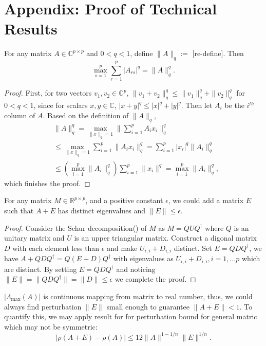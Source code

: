\section{Appendix: Proof of Technical Results}
\label{sec:proof_for_technical_lemmas}

\begin{lem}
\label{lemma:q_norm_eq}
For any matrix $A\in \mathbb{C}^{p \times p}$ and  $0<q<1$, define $\|A\|_q:= $ {\color{red} [re-define]}. Then 
\begin{equation}
\max_{s=1}^p  \sum_{r=1}^p |A_{rs}|^q = \|A\|_q^q.
\end{equation}
\begin{proof}
First, for two vectors $v_1, v_2\in \mathbb{C}^p$, $\|v_1+v_2\|_q^q\le \|v_1\|_q^q + \|v_2\|_q^q$ for $0<q<1$, since for scalars $x,y\in \mathbb{C}$, $|x+y|^q \le |x|^q+|y|^q$. Then let $A_i$ be the $i^{th}$ column of $A$. Based on the definition of $\|A\|_q$, 
\begin{equation}
\begin{aligned}
& \|A\|_q^q = \max_{\|x\|_q = 1} \|\sum_{i=1}^p A_ix_i\|_q^q \\
& \le  \max_{\|x\|_q = 1} \sum_{i=1}^p \|A_ix_i\|_q^q  = \sum_{i=1}^p |x_i|^q\|A_i\|_q^q\\
&\le (\max_{i=1}^p \|A_i\|_q^q) \sum_{i=1}^p\|x_i\|^q = \max_{i=1}^p \|A_i\|_q^q,
\end{aligned}
\end{equation}
which finishes the proof. 
\end{proof}
\end{lem}



\begin{lem}
\label{lemma:spectral_simple}
For any matrix $M\in \mathbb{R}^{p\times p}$, and a positive constant $\epsilon$, we could add a matrix $E$ such that $A+E$ has distinct eigenvalues and $\|E\|\le \epsilon$. 
\begin{proof}
Consider the Schur decomposition(\citep{golub2012matrix}) of $M$ as $M=QUQ^\dag$ where $Q$ is an unitary matrix and $U$ is an upper triangular matrix. Construct a digonal matrix
$D$ with each element less than $\epsilon$ and make $U_{i,i} + D_{i,i}$ distinct. Set $E = QDQ^\dag$, we have $A+QDQ^\dag = Q (E+D)Q^\dag$ with eigenvalues as $U_{i,i} + D_{i,i}, i=1,\dots p$ which are distinct. By setting $E= QDQ^\dag$ and noticing $\|E\| = \|QDQ^\dag\| = \|D\|\le \epsilon$ we complete the proof. 
\end{proof}
\begin{remark}
$|\Lambda_{\text{max}}(A)|$ is continuous mapping from matrix to real number, thus, we could always find perturbation $\|E\|$ small enough to guarantee $\|A+E\|<1$. To quantify this, we may apply result for \citet{bhatia1990bounds} for perturbation bound for general matric which may not be symmetric:
\begin{equation}
\label{eq:eigen_bound}
|\rho(A+E)-\rho(A)|\le 12\|A\|^{1-1/n}\|E\|^{1/n}.
\end{equation}
\end{remark}
\end{lem}


